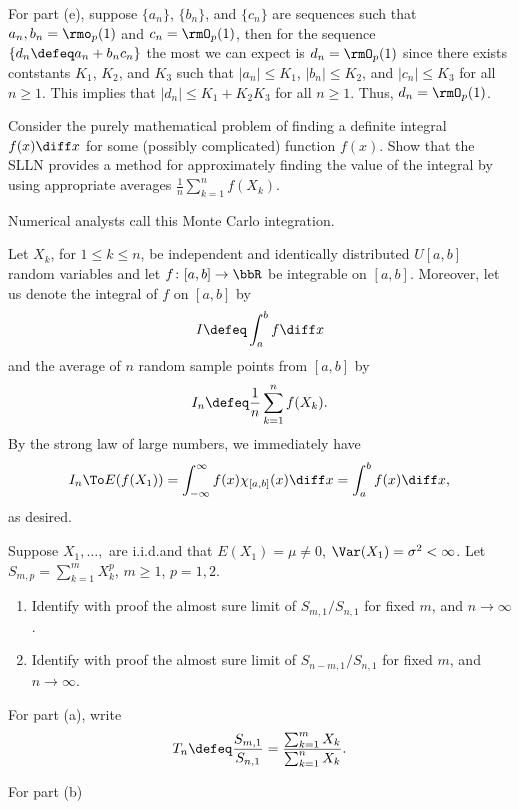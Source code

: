 \begin{solution}
  For part (e), suppose \(\{a_n\}\), \(\{b_n\}\), and \(\{c_n\}\) are
  sequences such that \(a_n,b_n=\rmo_p(1)\) and \(c_n=\rmO_p(1)\), then for
  the sequence \(\{d_n\defeq a_n+b_nc_n\}\) the most we can expect is
  \(d_n=\rmO_p(1)\) since there exists contstants \(K_1\), \(K_2\), and
  \(K_3\) such that \(|a_n|\leq K_1\), \(|b_n|\leq K_2\), and
  \(|c_n|\leq K_3\) for all \(n\geq 1\). This implies that
  \(|d_n|\leq K_1+K_2K_3\) for all \(n\geq 1\). Thus, \(d_n=\rmO_p(1)\).
\end{solution}
\newpage

\begin{problem}
  Consider the purely mathematical problem of finding a definite integral
  \(f(x)\diff x\) for some (possibly complicated) function \(f(x)\). Show
  that the SLLN provides a method for approximately finding the value of
  the integral by using appropriate averages
  \(\frac{1}{n}\sum_{k=1}^n f(X_k)\).

  Numerical analysts call this Monte Carlo integration.
\end{problem}
\begin{solution}
  Let \(X_k\), for \(1\leq k\leq n\), be independent and identically
  distributed \(U[a,b]\) random variables and let \(f\colon[a,b]\to\bbR\)
  be integrable on \([a,b]\). Moreover, let us denote the integral of \(f\)
  on \([a,b]\) by
  \[
    I\defeq\int_a^b f\diff x
  \]
  and the average of \(n\) random sample points from \([a,b]\) by
  \[
    I_n\defeq\frac{1}{n}\sum_{k=1}^n f(X_k).
  \]
  By the strong law of large numbers, we immediately have
  \[
    I_n\To E(f(X_1))=\int_{-\infty}^\infty f(x)\chi_{[a,b]}(x)\diff
    x=\int_a^b f(x)\diff x,
  \]
  as desired.
\end{solution}
\newpage

\begin{problem}[DasGupta 7.4 (a), (b)]
  Suppose \(X_1,\dotsc,\) are i.i.d.\@ and that \(E(X_1)=\mu\neq 0\),
  \(\Var(X_1)=\sigma^2<\infty\). Let \(S_{m,p}=\sum_{k=1}^m X_k^p\),
  \(m\geq 1\), \(p=1,2\).
  \begin{enumerate}[label=(\alph*),noitemsep]
  \item Identify with proof the almost sure limit of \(S_{m,1}/S_{n,1}\)
    for fixed \(m\), and \(n\to\infty\).
  \item Identify with proof the almost sure limit of \(S_{n-m,1}/S_{n,1}\)
    for fixed \(m\), and \(n\to\infty\).
  \end{enumerate}
\end{problem}
\begin{solution}
  For part (a), write
  \[
    T_n\defeq\frac{S_{m,1}}{S_{n,1}}=\frac{\sum_{k=1}^m X_k}{\sum_{k=1}^n X_k}.
  \]

  For part (b)
\end{solution}
\newpage

